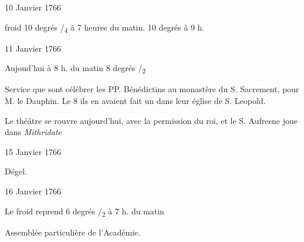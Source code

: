                      \begin{diary}{10 Janvier 1766}{}
                        
                        
                           froid 10 degrés
                              /\textsubscript{4} à 7 heures du
                              matin.
                           10 degrés à 9 h. \bigskip
        
        
                     \end{diary}

                     \begin{diary}{11 Janvier 1766}{}
                        
                        
                           Aujoud'hui à 8 h.
                              du matin
                           8 degrés
                              /\textsubscript{2}
                        \bigskip
        
        
                         Service que sont célébrer les PP. Bénédictins
                           au monastère du S.
                              Sacrement, pour
                           M. le Dauphin. Le 8 ils en avaient
                           fait un dans leur église de S.
                              Leopold. \bigskip
        
        
                        
                           Le théâtre se rouvre
                           aujourd'hui, avec la
                           permission du roi, et
                              le S. Aufresne joue
                           dans \emph{Mithridate}
                        \bigskip
        
        
                     \end{diary}

                     \begin{diary}{15 Janvier 1766}{}
                        
                         Dégel. \bigskip
        
        
                     \end{diary}
                     \begin{diary}{16 Janvier 1766}{}
                        
                         Le froid reprend 6 degrés
                              /\textsubscript{2} à 7 h. du matin
                        \bigskip
        
        
                         Assemblée particulière de l'Académie. \bigskip
        
        
                     \end{diary}

